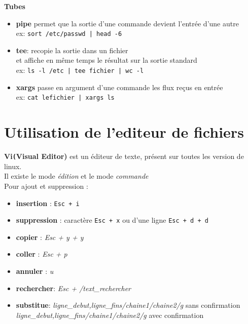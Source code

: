 \documentclass[french]{beamer}
\begin{document}
\begin{frame}
\textbf{Tubes}
    \begin{itemize}
    \item \textbf{pipe} permet que la sortie d'une commande devient l'entrée
    d'une autre \\
    ex: \texttt{sort /etc/passwd | head -6}
    \item \textbf{tee}: recopie la sortie dans un fichier \\et affiche en même
    temps le résultat sur la sortie standard \\
    ex: \texttt{ls -l /etc | tee fichier | wc  -l}
    \item \textbf{xargs} passe en argument d'une commande les flux reçus en
    entrée\\
    ex: \texttt{cat lefichier | xargs ls}

    \end{itemize}
\end{frame}


\section{Utilisation de l'editeur de fichiers}
\frame{\tableofcontents[current]}


\begin{frame}
\textbf{Vi\texttt(Visual Editor)} 
est un éditeur de texte, présent sur toutes les version de linux. \\
Il existe le mode \textit{édition} et le mode \textit{commande} \\
Pour ajout et suppression :
\begin{itemize}
    \item \textbf{insertion} : \texttt{Esc + i} 
    \item \textbf{suppression} : caractère \texttt{Esc + x} ou d'une ligne \texttt{Esc + d + d}
    \item \textbf{copier} : \textit{Esc + y + y} 
    \item \textbf{coller} : \textit{Esc + p} 
    \item \textbf{annuler} : \textit{u} 
    \end{itemize}
\end{frame}

\begin{frame}
    \begin{itemize}
    \item \textbf{rechercher}: \textit{Esc + /text\_rechercher}
    \item \textbf{substitue}:
    \textit{ligne\_debut,ligne\_fins/chaine1/chaine2/g} sans confirmation \\
    \textit{ligne\_debut,ligne\_fins/chaine1/chaine2/g} avec confirmation \\
    \end{itemize}
\end{frame}
\end{document}
